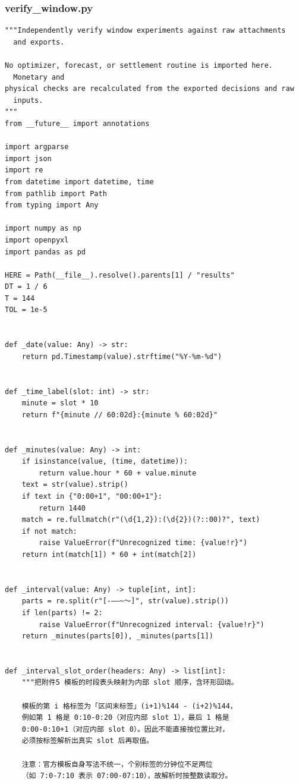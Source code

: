 \subsubsection*{verify\_window.py}
\begin{verbatim}
"""Independently verify window experiments against raw attachments
  and exports.

No optimizer, forecast, or settlement routine is imported here.
  Monetary and
physical checks are recalculated from the exported decisions and raw
  inputs.
"""
from __future__ import annotations

import argparse
import json
import re
from datetime import datetime, time
from pathlib import Path
from typing import Any

import numpy as np
import openpyxl
import pandas as pd

HERE = Path(__file__).resolve().parents[1] / "results"
DT = 1 / 6
T = 144
TOL = 1e-5


def _date(value: Any) -> str:
    return pd.Timestamp(value).strftime("%Y-%m-%d")


def _time_label(slot: int) -> str:
    minute = slot * 10
    return f"{minute // 60:02d}:{minute % 60:02d}"


def _minutes(value: Any) -> int:
    if isinstance(value, (time, datetime)):
        return value.hour * 60 + value.minute
    text = str(value).strip()
    if text in {"0:00+1", "00:00+1"}:
        return 1440
    match = re.fullmatch(r"(\d{1,2}):(\d{2})(?::00)?", text)
    if not match:
        raise ValueError(f"Unrecognized time: {value!r}")
    return int(match[1]) * 60 + int(match[2])


def _interval(value: Any) -> tuple[int, int]:
    parts = re.split(r"[-–—~～]", str(value).strip())
    if len(parts) != 2:
        raise ValueError(f"Unrecognized interval: {value!r}")
    return _minutes(parts[0]), _minutes(parts[1])


def _interval_slot_order(headers: Any) -> list[int]:
    """把附件5 模板的时段表头映射为内部 slot 顺序，含环形回绕。

    模板的第 i 格标签为「区间末标签」(i+1)%144 - (i+2)%144，
    例如第 1 格是 0:10-0:20（对应内部 slot 1），最后 1 格是
    0:00-0:10+1（对应内部 slot 0）。因此不能直接按位置比对，
    必须按标签解析出真实 slot 后再取值。

    注意：官方模板自身写法不统一，个别标签的分钟位不足两位
    （如 7:0-7:10 表示 07:00-07:10），故解析时按整数读取分。


\end{verbatim}
